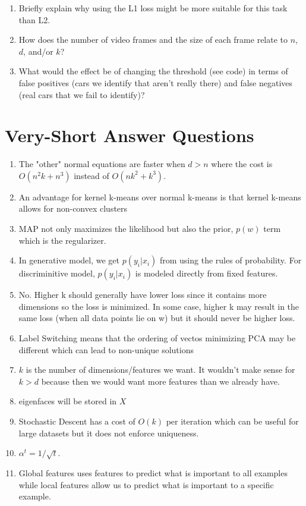 \documentclass{article}
\def\enum#1{\begin{enumerate}#1\end{enumerate}}
\begin{document}
\enum{
\item Briefly explain why using the L1 loss might be more suitable for this task than L2. 
\item How does the number of video frames and the size of each frame relate to $n$, $d$, and/or $k$?
\item What would the effect be of changing the threshold (see code) in terms of false positives (cars we identify that aren't really there) and false negatives (real cars that we fail to identify)?
}

\section{Very-Short Answer Questions}

\enum{
\item The "other" normal equations are faster when $d>n$ where the cost is $O(n^2k+n^3)$ instead of $O(nk^2+k^3)$.
\item An advantage for kernel k-means over normal k-means is that kernel k-means allows for non-convex clusters
\item MAP not only maximizes the likelihood but also the prior, $p(w)$ term which is the regularizer.
\item In generative model, we get $p(y_i|x_i)$ from using the rules of probability. For discriminitive model, $p(y_i|x_i)$
is modeled directly from fixed features. 
\item No. Higher k should generally have lower loss since it contains more dimensions so the loss is minimized. In some case,
higher k may result in the same loss (when all data points lie on w) but it should never be higher loss. 
\item Label Switching means that the ordering of vectos minimizing PCA may be different which can lead to non-unique solutions
\item $k$ is the number of dimensions/features we want. It wouldn't make sense for $k>d$ because then we would want more
features than we already have.
\item eigenfaces will be stored in $X$
\item Stochastic Descent has a cost of $O(k)$ per iteration which can be useful for large datasets but it does not enforce
uniqueness. 
\item $\alpha^t = 1/\sqrt{t}$.
\item Global features uses features to predict what is important to all examples while local features allow us to predict
what is important to a specific example.
}
\end{document}
